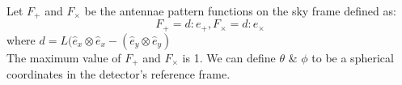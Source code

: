 \documentclass{ttuthes2007}
\begin{document}
Let $F_+$ and $F_\times$ be the antennae pattern functions on the sky frame
defined as:
\begin{equation}
F_+=d:e_+,  F_\times=d:e_\times
\end{equation}
where $d=L(\hat{e}_x\otimes\hat{e}_x-(\hat{e}_y\otimes\hat{e}_y)$\\ 

The maximum value of $F_+$ and $F_\times$ is 1. We can define $\theta$ \&
$\phi$ to be a spherical coordinates in the detector's reference frame. 
%
%
\end{document}
